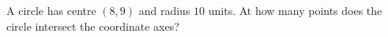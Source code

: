 A circle has centre $(8,9)$ and radius $10$ units. At how many points does the circle intersect the coordinate axes?
